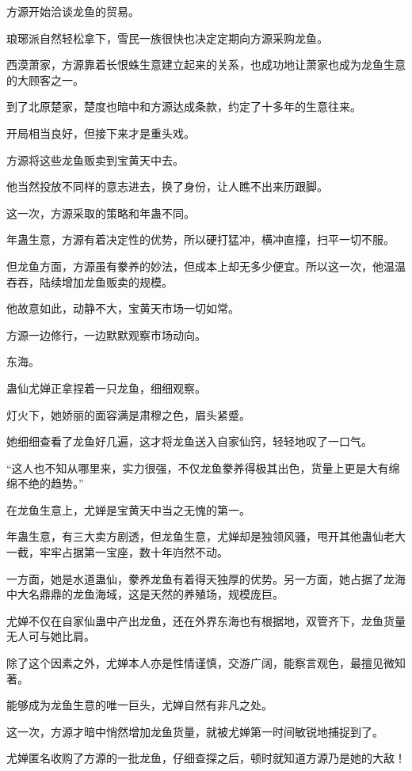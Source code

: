 \begin{this_body}
方源开始洽谈龙鱼的贸易。

琅琊派自然轻松拿下，雪民一族很快也决定定期向方源采购龙鱼。

西漠萧家，方源靠着长恨蛛生意建立起来的关系，也成功地让萧家也成为龙鱼生意的大顾客之一。

到了北原楚家，楚度也暗中和方源达成条款，约定了十多年的生意往来。

开局相当良好，但接下来才是重头戏。

方源将这些龙鱼贩卖到宝黄天中去。

他当然投放不同样的意志进去，换了身份，让人瞧不出来历跟脚。

这一次，方源采取的策略和年蛊不同。

年蛊生意，方源有着决定性的优势，所以硬打猛冲，横冲直撞，扫平一切不服。

但龙鱼方面，方源虽有豢养的妙法，但成本上却无多少便宜。所以这一次，他温温吞吞，陆续增加龙鱼贩卖的规模。

他故意如此，动静不大，宝黄天市场一切如常。

方源一边修行，一边默默观察市场动向。

东海。

蛊仙尤婵正拿捏着一只龙鱼，细细观察。

灯火下，她娇丽的面容满是肃穆之色，眉头紧蹙。

她细细查看了龙鱼好几遍，这才将龙鱼送入自家仙窍，轻轻地叹了一口气。

“这人也不知从哪里来，实力很强，不仅龙鱼豢养得极其出色，货量上更是大有绵绵不绝的趋势。”

在龙鱼生意上，尤婵是宝黄天中当之无愧的第一。

年蛊生意，有三大卖方剧透，但龙鱼生意，尤婵却是独领风骚，甩开其他蛊仙老大一截，牢牢占据第一宝座，数十年岿然不动。

一方面，她是水道蛊仙，豢养龙鱼有着得天独厚的优势。另一方面，她占据了龙海中大名鼎鼎的龙鱼海域，这是天然的养殖场，规模庞巨。

尤婵不仅在自家仙蛊中产出龙鱼，还在外界东海也有根据地，双管齐下，龙鱼货量无人可与她比肩。

除了这个因素之外，尤婵本人亦是性情谨慎，交游广阔，能察言观色，最擅见微知著。

能够成为龙鱼生意的唯一巨头，尤婵自然有非凡之处。

这一次，方源才暗中悄然增加龙鱼货量，就被尤婵第一时间敏锐地捕捉到了。

尤婵匿名收购了方源的一批龙鱼，仔细查探之后，顿时就知道方源乃是她的大敌！


\end{this_body}
